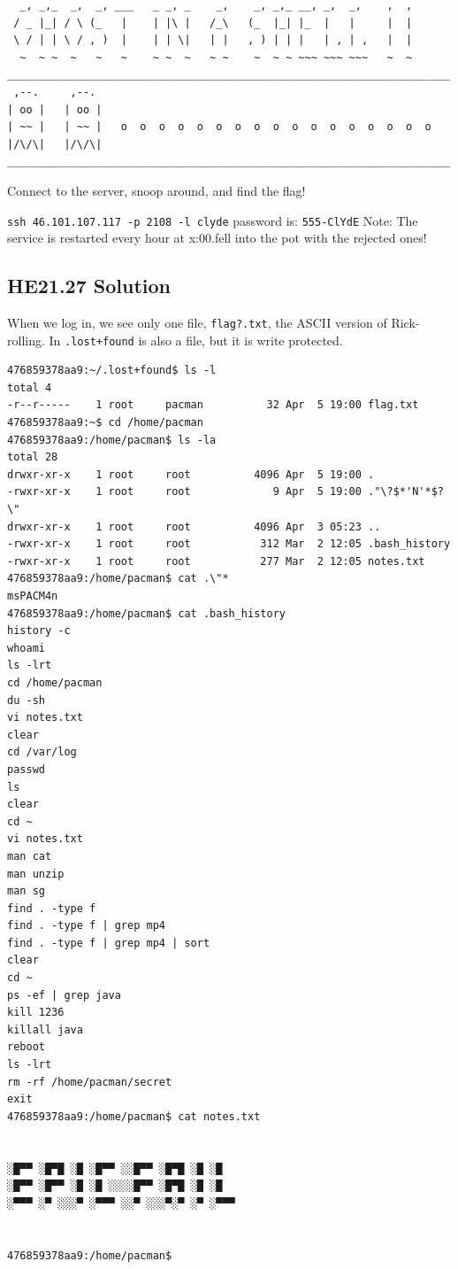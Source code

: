 \documentclass[english,a4paper,nols,noindent]{tufte-handout}
\begin{document}
\begin{verbatim} 
  _, _,_  _,  _, ___   _ _, _    _,    _, _,_ __, _,  _,    ,  ,  
 / _ |_| / \ (_   |    | |\ |   /_\   (_  |_| |_  |   |     |  |  
 \ / | | \ / , )  |    | | \|   | |   , ) | | |   | , | ,   |  |  
  ~  ~ ~  ~   ~   ~    ~ ~  ~   ~ ~    ~  ~ ~ ~~~ ~~~ ~~~   ~  ~  
______________________________________________________________________  
 ,--.     ,--.    
| oo |   | oo |   
| ~~ |   | ~~ |   o  o  o  o  o  o  o  o  o  o  o  o  o  o  o  o  o  
|/\/\|   |/\/\|     
______________________________________________________________________  
\end{verbatim} 

\noindent Connect to the server, snoop around, and find the flag!

\verb+ssh 46.101.107.117 -p 2108 -l clyde+
password is: \verb+555-ClYdE+
Note: The service is restarted every hour at x:00.fell into the pot with the rejected ones!

\hypertarget{he21.27-solution}{%
\subsection{HE21.27 Solution}\label{he21.27-solution}}

\noindent When we log in, we see only one file, \verb+flag?.txt+, the ASCII version of Rick-rolling.  In \verb$.lost+found$ is also a file, but it is write protected.

\begin{verbatim}
476859378aa9:~/.lost+found$ ls -l
total 4
-r--r-----    1 root     pacman          32 Apr  5 19:00 flag.txt
476859378aa9:~$ cd /home/pacman
476859378aa9:/home/pacman$ ls -la
total 28
drwxr-xr-x    1 root     root          4096 Apr  5 19:00 .
-rwxr-xr-x    1 root     root             9 Apr  5 19:00 ."\?$*'N'*$?\"
drwxr-xr-x    1 root     root          4096 Apr  3 05:23 ..
-rwxr-xr-x    1 root     root           312 Mar  2 12:05 .bash_history
-rwxr-xr-x    1 root     root           277 Mar  2 12:05 notes.txt
476859378aa9:/home/pacman$ cat .\"*
msPACM4n
476859378aa9:/home/pacman$ cat .bash_history
history -c
whoami
ls -lrt
cd /home/pacman
du -sh
vi notes.txt
clear
cd /var/log
passwd
ls
clear
cd ~
vi notes.txt
man cat
man unzip
man sg
find . -type f
find . -type f | grep mp4
find . -type f | grep mp4 | sort
clear
cd ~
ps -ef | grep java
kill 1236
killall java
reboot
ls -lrt
rm -rf /home/pacman/secret
exit
476859378aa9:/home/pacman$ cat notes.txt


░█▀▀ ░█▀█ ░█ ░█▀▀ ░░█▀▀ ░█▀█ ░█ ░█
░█▀▀ ░█▀▀ ░█ ░█ ░░░░█▀▀ ░█▀█ ░█ ░█
░▀▀▀ ░▀ ░░░▀ ░▀▀▀ ░░▀ ░░░▀░▀ ░▀ ░▀▀▀


476859378aa9:/home/pacman$ 
\end{verbatim} 
\end{document}
